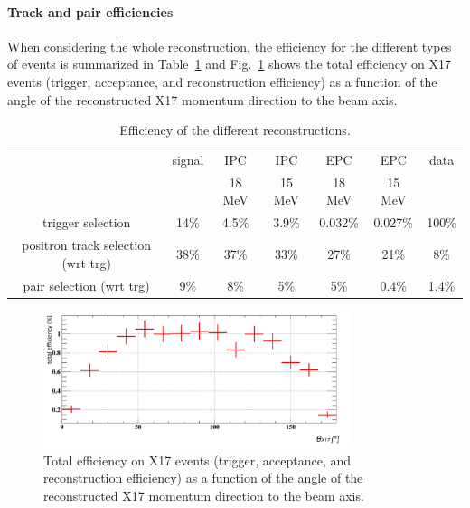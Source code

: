 \begin{refsection}
        \paragraph{Track and pair efficiencies}
        When considering the whole reconstruction, the efficiency for the different types of events is summarized in Table~\ref{tab:X17:efficiency} and Fig.~\ref{fig:X17:totaleff} shows the total efficiency on X17 events (trigger, acceptance, and reconstruction efficiency) as a function of the angle of the reconstructed X17 momentum direction to the beam axis.
        
        \begin{table}[]
            \centering
            \begin{tabular}{|c|c|c|c|c|c|c|}
                 \hline
            &  signal & IPC        & IPC         & EPC      & EPC      & data   \\
            &   & 18 MeV        & 15 MeV         & 18 MeV      & 15 MeV   &    \\
             \hline
                 trigger selection  & 14\% & 4.5\%& 3.9\%&  0.032\% & 0.027\% &  100\%   \\      \hline
                  positron track selection (wrt trg)    & 38\%    & 37\%& 33\%&  27\%& 21\%& 8\%    \\      \hline
                        pair selection (wrt trg)          & 9\% & 8\%& 5\%&  5\% & 0.4\%&   1.4\%  \\      \hline
                \end{tabular}
            \caption{Efficiency of the different reconstructions.}
            \label{tab:X17:efficiency}
        \end{table}

        \begin{figure}[]
            \centering
            \includegraphics[width=0.8\textwidth]{Figures/X17/Analysis/TotalEff.pdf}
            \caption[X17: reconstruction efficiency]{Total efficiency on X17 events (trigger, acceptance, and reconstruction efficiency) as a function of the angle of the reconstructed X17 momentum direction to the beam axis.}
            \label{fig:X17:totaleff}
        \end{figure}


\end{refsection}
